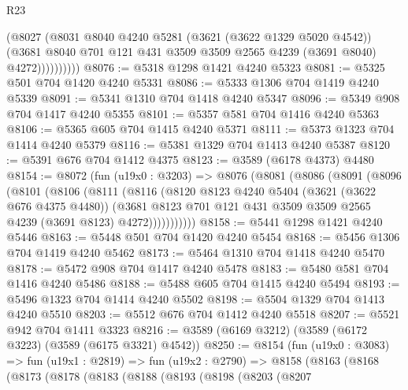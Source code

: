 \begin{lexlean}{R23}
\begin{coremodule}
                  (@8027
                    (@8031
                      @8040
                      @4240
                      @5281
                      (@3621 (@3622 @1329 @5020 @4542))
                      (@3681
                        @8040
                        @701
                        @121
                        @431
                        @3509
                        @3509
                        @2565
                        @4239
                        (@3691 @8040)
                        @4272))))))))))
@8076 := @5318 @1298 @1421 @4240 @5323
@8081 := @5325 @501 @704 @1420 @4240 @5331
@8086 := @5333 @1306 @704 @1419 @4240 @5339
@8091 := @5341 @1310 @704 @1418 @4240 @5347
@8096 := @5349 @908 @704 @1417 @4240 @5355
@8101 := @5357 @581 @704 @1416 @4240 @5363
@8106 := @5365 @605 @704 @1415 @4240 @5371
@8111 := @5373 @1323 @704 @1414 @4240 @5379
@8116 := @5381 @1329 @704 @1413 @4240 @5387
@8120 := @5391 @676 @704 @1412 @4375
@8123 := @3589 (@6178 @4373) @4480
@8154 := @8072
    (fun (u19x0 : @3203) =>
    @8076
      (@8081
        (@8086
          (@8091
            (@8096
              (@8101
                (@8106
                  (@8111
                    (@8116
                      (@8120
                        @8123
                        @4240
                        @5404
                        (@3621 (@3622 @676 @4375 @4480))
                        (@3681
                          @8123
                          @701
                          @121
                          @431
                          @3509
                          @3509
                          @2565
                          @4239
                          (@3691 @8123)
                          @4272)))))))))))
@8158 := @5441 @1298 @1421 @4240 @5446
@8163 := @5448 @501 @704 @1420 @4240 @5454
@8168 := @5456 @1306 @704 @1419 @4240 @5462
@8173 := @5464 @1310 @704 @1418 @4240 @5470
@8178 := @5472 @908 @704 @1417 @4240 @5478
@8183 := @5480 @581 @704 @1416 @4240 @5486
@8188 := @5488 @605 @704 @1415 @4240 @5494
@8193 := @5496 @1323 @704 @1414 @4240 @5502
@8198 := @5504 @1329 @704 @1413 @4240 @5510
@8203 := @5512 @676 @704 @1412 @4240 @5518
@8207 := @5521 @942 @704 @1411 @3323
@8216 := @3589 (@6169 @3212) (@3589 (@6172 @3223) (@3589 (@6175 @3321) @4542))
@8250 := @8154
    (fun (u19x0 : @3083) =>
    fun (u19x1 : @2819) =>
    fun (u19x2 : @2790) =>
    @8158
      (@8163
        (@8168
          (@8173
            (@8178
              (@8183
                (@8188
                  (@8193
                    (@8198
                      (@8203
                        (@8207

\end{coremodule}
\end{lexlean}
